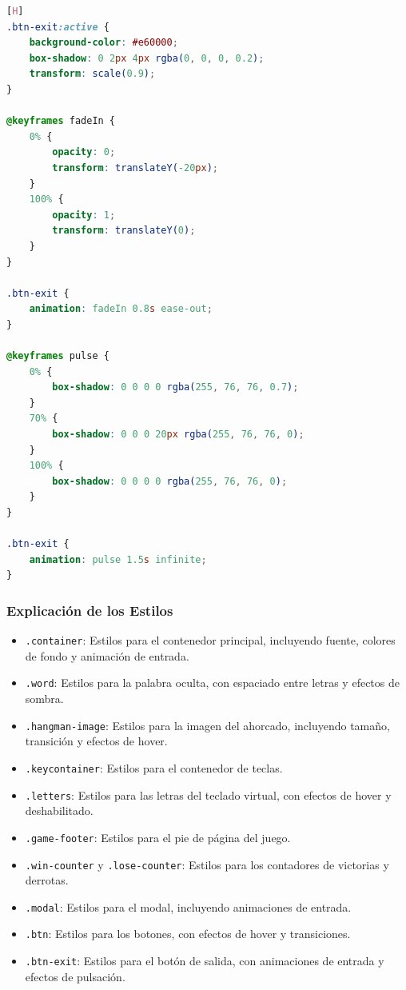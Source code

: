 \documentclass{article}
\begin{document}
\begin{itemize}
\begin{lstlisting}[language=css,caption ={src\app\components\game\game.component.css}][H]
.btn-exit:active {
    background-color: #e60000;
    box-shadow: 0 2px 4px rgba(0, 0, 0, 0.2);
    transform: scale(0.9);
}

@keyframes fadeIn {
    0% {
        opacity: 0;
        transform: translateY(-20px);
    }
    100% {
        opacity: 1;
        transform: translateY(0);
    }
}

.btn-exit {
    animation: fadeIn 0.8s ease-out;
}

@keyframes pulse {
    0% {
        box-shadow: 0 0 0 0 rgba(255, 76, 76, 0.7);
    }
    70% {
        box-shadow: 0 0 0 20px rgba(255, 76, 76, 0);
    }
    100% {
        box-shadow: 0 0 0 0 rgba(255, 76, 76, 0);
    }
}

.btn-exit {
    animation: pulse 1.5s infinite;
}
\end{lstlisting}

\subsubsection{Explicación de los Estilos}

\begin{itemize}
  \item \texttt{.container}: Estilos para el contenedor principal, incluyendo fuente, colores de fondo y animación de entrada.
  \item \texttt{.word}: Estilos para la palabra oculta, con espaciado entre letras y efectos de sombra.
  \item \texttt{.hangman-image}: Estilos para la imagen del ahorcado, incluyendo tamaño, transición y efectos de hover.
  \item \texttt{.keycontainer}: Estilos para el contenedor de teclas.
  \item \texttt{.letters}: Estilos para las letras del teclado virtual, con efectos de hover y deshabilitado.
  \item \texttt{.game-footer}: Estilos para el pie de página del juego.
  \item \texttt{.win-counter} y \texttt{.lose-counter}: Estilos para los contadores de victorias y derrotas.
  \item \texttt{.modal}: Estilos para el modal, incluyendo animaciones de entrada.
  \item \texttt{.btn}: Estilos para los botones, con efectos de hover y transiciones.
  \item \texttt{.btn-exit}: Estilos para el botón de salida, con animaciones de entrada y efectos de pulsación.
\end{itemize}


\end{itemize}
\end{document}
